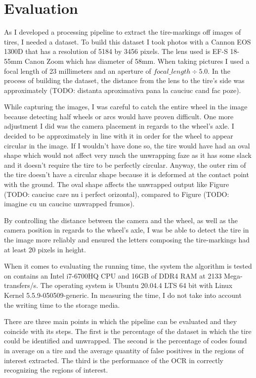 \chapter{Evaluation}\pagestyle{fancy}\setlength{\parindent}{3em}
\label{chapter:evaluation}

As I developed a processing pipeline to extract the tire-markings off images of tires, I needed a dataset. To build this dataset I took photos with a Cannon EOS 1300D that has a resolution of 5184 by 3456 pixels. The lens used is EF-S 18-55mm Canon Zoom which has diameter of 58mm. When taking pictures I used a focal length of 23 millimeters and an aperture of $focal\_length \div 5.0$. In the process of building the dataset, the distance from the lens to the tire's side was approximately (TODO: distanta aproximativa pana la cauciuc cand fac poze).

While capturing the images, I was careful to catch the entire wheel in the image because detecting half wheels or arcs would have proven difficult. One more adjustment I did was the camera placement in regards to the wheel's axle. I decided to be approximately in line with it in order for the wheel to appear circular in the image. If I wouldn't have done so, the tire would have had an oval shape which would not affect very much the unwrapping faze as it has some slack and it doesn't require the tire to be perfectly circular. Anyway, the outer rim of the tire doesn't have a circular shape because it is deformed at the contact point with the ground. The oval shape affects the unwrapped output like Figure (TODO: cauciuc care nu i perfect orizontal), compared to Figure (TODO: imagine cu un cauciuc unwrapped frumos).

By controlling the distance between the camera and the wheel, as  well as the camera position in regards to the wheel's axle, I was be able to detect the tire in the image more reliably and ensured the letters composing the tire-markings had at least 20 pixels in height.

When it comes to evaluating the running time, the system the algorithm is tested on contains an Intel i7-6700HQ CPU and 16GB of DDR4 RAM at 2133 Mega-transfers/s. The operating system is Ubuntu 20.04.4 LTS 64 bit with Linux Kernel 5.5.9-050509-generic. In measuring the time, I do not take into account the writing time to the storage media.

There are three main points in which the pipeline can be evaluated and they coincide with its steps. The first is the percentage of the dataset in which the tire could be identified and unwrapped. The second is the percentage of codes found in average on a tire and the average quantity of false positives in the regions of interest extracted. The third is the performance of the OCR in correctly recognizing the regions of interest.

